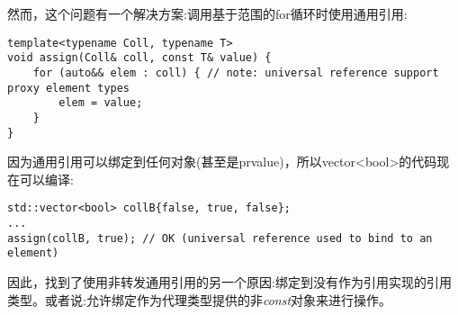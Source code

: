 然而，这个问题有一个解决方案:调用基于范围的for循环时使用通用引用:\par

\begin{lstlisting}[caption={}]
template<typename Coll, typename T>
void assign(Coll& coll, const T& value) {
	for (auto&& elem : coll) { // note: universal reference support proxy element types
		elem = value;
	}
}
\end{lstlisting}

因为通用引用可以绑定到任何对象(甚至是prvalue)，所以vector<bool>的代码现在可以编译:\par

\begin{lstlisting}[caption={}]
std::vector<bool> collB{false, true, false};
...
assign(collB, true); // OK (universal reference used to bind to an element)
\end{lstlisting}

因此，找到了使用非转发通用引用的另一个原因:绑定到没有作为引用实现的引用类型。或者说:允许绑定作为代理类型提供的非\textit{const}对象来进行操作。\par

































